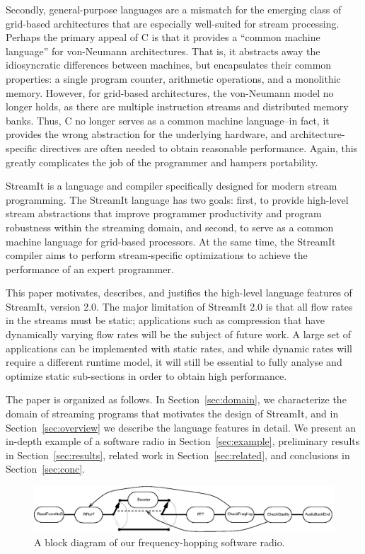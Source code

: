 Secondly, general-purpose languages are a mismatch for the emerging
class of grid-based architectures \cite{smartmemories,rawshort,trips} that
are especially well-suited for stream processing.  Perhaps the primary
appeal of C is that it provides a ``common machine language'' for
von-Neumann architectures.  That is, it abstracts away the
idiosyncratic differences between machines, but encapsulates their
common properties: a single program counter, arithmetic operations,
and a monolithic memory.  However, for grid-based architectures, the
von-Neumann model no longer holds, as there are multiple instruction
streams and distributed memory banks.  Thus, C no longer serves as a
common machine language--in fact, it provides the wrong abstraction
for the underlying hardware, and architecture-specific directives are
often needed to obtain reasonable performance.  Again, this greatly
complicates the job of the programmer and hampers portability.

\pubidadjcol

StreamIt is a language and compiler specifically designed for modern
stream programming.  The StreamIt language has two goals: first, to
provide high-level stream abstractions that improve programmer
productivity and program robustness within the streaming domain, and
second, to serve as a common machine language for grid-based
processors.  At the same time, the StreamIt compiler aims to perform
stream-specific optimizations to achieve the performance of an expert
programmer.

This paper motivates, describes, and justifies the high-level language
features of StreamIt, version 2.0.  The major limitation of StreamIt
2.0 is that all flow rates in the streams must be static; applications
such as compression that have dynamically varying flow rates will be
the subject of future work.  A large set of applications can be
implemented with static rates, and while dynamic rates will require a
different runtime model, it will still be essential to fully analyse
and optimize static sub-sections in order to obtain high performance.

The paper is organized as follows. In Section~\ref{sec:domain}, we
characterize the domain of streaming programs that motivates the
design of StreamIt, and in Section~\ref{sec:overview} we describe the
language features in detail.  We present an in-depth example of a
software radio in Section~\ref{sec:example}, preliminary results in
Section~\ref{sec:results}, related work in Section~\ref{sec:related},
and conclusions in Section~\ref{sec:conc}.

\begin{figure}
  \centering
  \includegraphics[width=\columnwidth]{Radio.eps}
  \caption{A block diagram of our frequency-hopping software radio.}
  \label{fig:radiodiagram}
\end{figure}

